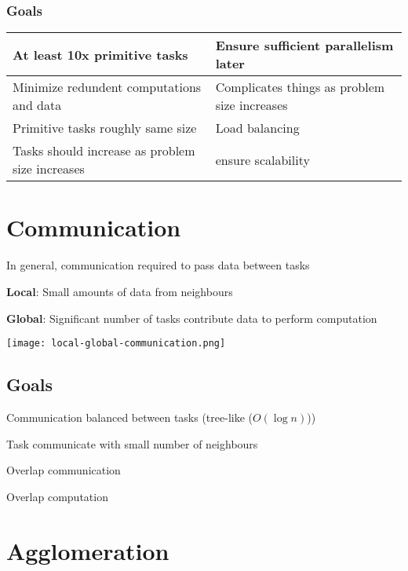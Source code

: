 \documentclass[12pt]{article}
\begin{document}
\begin{spacing}{1.5}
\subsubsection{Goals}

\begin{tabular}{p{6cm} | p{6cm}}

At least 10x primitive tasks & Ensure sufficient parallelism later \\ 
\hline

Minimize redundent computations and data & Complicates things as problem size increases \\ 
\hline

Primitive tasks roughly same size & Load balancing \\ 
\hline

Tasks should increase as problem size increases & ensure scalability
\end{tabular}

\section{Communication}

In general, communication required to pass data between tasks

\begin{itemize*}
	\item \textbf{Local}: Small amounts of data from neighbours 
	\item \textbf{Global}: Significant number of tasks contribute data to perform computation
\end{itemize*}

\texttt{[image: local-global-communication.png]}

\subsection{Goals}

\begin{itemize*}
	\item Communication balanced between tasks (tree-like ($O(\log{n})$))
	\item Task communicate with small number of neighbours
	\item Overlap communication
	\item Overlap computation
\end{itemize*}

\section{Agglomeration}


\end{spacing}
\end{document}
